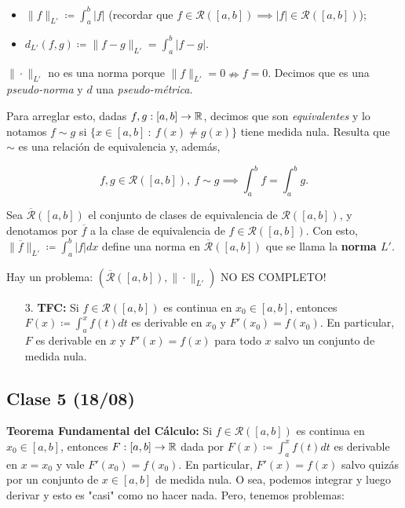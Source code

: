 \documentclass[a4paper]{report}
\begin{document}
	\begin{itemize}
		\item $\| f \|_{L'} \coloneq \int_{a}^{b} |f|$ (recordar que $f \in \mathcal{R}([a,b]) \implies |f| \in \mathcal{R}([a,b])$);

		\item $d_{L'} (f,g) \coloneq \| f - g \|_{L'} = \int_{a}^{b} |f-g|$.
	\end{itemize}

	\begin{remark}
		$\| \cdot \|_{L'}$ no es una norma porque $\| f \|_{L'} = 0 \nRightarrow f = 0$. Decimos que es una \textit{pseudo-norma} y $d$ una \textit{pseudo-métrica}.
	\end{remark}

	Para arreglar esto, dadas $f,g : [a,b] \to \mathbb{R}$, decimos que son \textit{equivalentes} y lo notamos $f \sim g$ si $\{ x \in [a,b] \ : \ f(x) \neq g(x) \}$ tiene medida nula. Resulta que $\sim$ es una relación de equivalencia y, además,

	\[
	f,g \in \mathcal{R} ([a,b]),\ f \sim g \implies \int_{a}^{b} f = \int_{a}^{b} g.
	\]

	Sea $\overline{\mathcal{R}}([a,b])$ el conjunto de clases de equivalencia de $\mathcal{R}([a,b])$, y denotamos por $\overline{f}$ a la clase de equivalencia de $f \in \mathcal{R}([a,b])$. Con esto, $\| \overline{f} \|_{L'} \coloneq \int_{a}^{b} |f| dx$ define una norma en $\overline{\mathcal{R}} ([a,b])$ que se llama la \textbf{norma $L'$}.

	\begin{remark}
		Hay un problema: $(\overline{\mathcal{R}} ([a,b]), \| \cdot \|_{L'})$ NO ES COMPLETO!
	\end{remark}

	\begin{enumerate}
		\item[3.] \textbf{TFC:} Si $f \in \mathcal{R} ([a,b])$ es continua en $x_0 \in [a,b]$, entonces $F(x) \coloneq \int_{a}^{x} f(t) dt$ es derivable en $x_0$ y $F'(x_0) = f(x_0)$. En particular, $F$ es derivable en $x$ y $F'(x)=f(x)$ para todo $x$ salvo un conjunto de medida nula.
	\end{enumerate}


	\subsection{Clase 5 (18/08)}

	\noindent \textbf{Teorema Fundamental del Cálculo: } Si $f \in \mathcal{R}([a,b])$ es continua en $x_0 \in [a,b]$, entonces $F: [a,b] \to \mathbb{R}$ dada por $F(x) \coloneq \int_{a}^{x} f(t) dt$ es derivable en $x=x_0$ y vale $F'(x_0) = f(x_0)$. En particular, $F'(x) = f(x)$ salvo quizás por un conjunto de $x \in [a,b]$ de medida nula. O sea, podemos integrar y luego derivar y esto es "casi" como no hacer nada. Pero, tenemos problemas:
\end{document}
